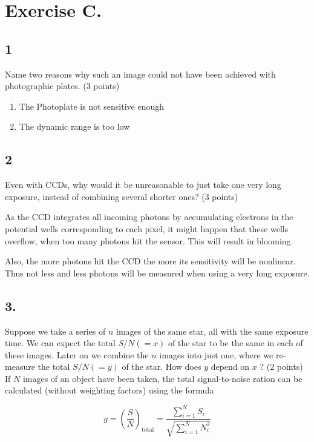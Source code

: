 \documentclass[11pt,a4paper,twoside]{article}
\begin{document}
\section*{Exercise C.}

\subsection*{1} Name two reasons why such an image could not have been achieved with photographic
plates. (3 points)
\newline

\begin{enumerate}
\item The Photoplate is not sensitive enough
\item The dynamic range is too low
\end{enumerate}

\subsection*{2} Even with CCDs, why would it be unreasonable to just take one very long exposure,
instead of combining several shorter ones? (3 points)
\newline

As the CCD integrates all incoming photons by accumulating electrons in the 
potential wells corresponding to each pixel, it might happen that these wells
overflow, when too many photons hit the sensor. This will result in blooming.

Also, the more photons hit the CCD the more its sensitivity will be nonlinear.
Thus not less and less photons will be measured when using a very long exposure.


\subsection*{3.}  Suppose we take a series of $n$ images of the same star, all with the same exposure time. We can expect the total $S/N (= x)$ of the star to be the same in each of these images. Later on we combine the $n$ images into just one, where we re-measure the total $S/N (= y)$ of the star. How does $y$ depend on $x$ ? (2 points) \\

If $N$ images of an object have been taken, the total signal-to-noise ration can be calculated (without weighting factors) using the formula

\begin{equation}
 y = \left( \frac{S}{N} \right)_{\text{total}} = \frac{\sum_{i=1}^N S_i}{\sqrt{\sum_{i=1}^N N_i^2}}
\end{equation}
\end{document}
